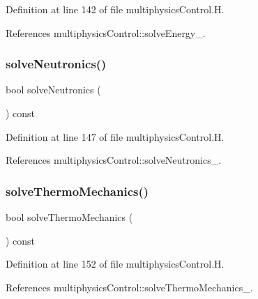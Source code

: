 Definition at line 142 of file multiphysics\+Control.\+H.



References multiphysics\+Control\+::solve\+Energy\+\_\+.

\mbox{\label{classFoam_1_1multiphysicsControl_ac6145d491fb669957dc010cd38ebcc35}} 
\subsubsection{\texorpdfstring{solve\+Neutronics()}{solveNeutronics()}}
{\footnotesize\ttfamily bool solve\+Neutronics (\begin{DoxyParamCaption}{ }\end{DoxyParamCaption}) const\hspace{0.3cm}{\ttfamily [inline]}}



Definition at line 147 of file multiphysics\+Control.\+H.



References multiphysics\+Control\+::solve\+Neutronics\+\_\+.

\mbox{\label{classFoam_1_1multiphysicsControl_a1802a25723969278d0a1dd57abbc1611}} 
\subsubsection{\texorpdfstring{solve\+Thermo\+Mechanics()}{solveThermoMechanics()}}
{\footnotesize\ttfamily bool solve\+Thermo\+Mechanics (\begin{DoxyParamCaption}{ }\end{DoxyParamCaption}) const\hspace{0.3cm}{\ttfamily [inline]}}



Definition at line 152 of file multiphysics\+Control.\+H.



References multiphysics\+Control\+::solve\+Thermo\+Mechanics\+\_\+.

